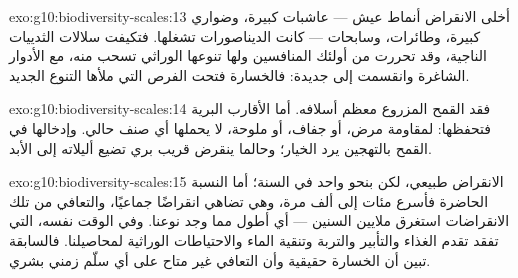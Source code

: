 \begin{solution}{exo:g10:biodiversity-scales:13}
أخلى الانقراض أنماط عيش --- عاشبات كبيرة، وضواري كبيرة، وطائرات،
وسابحات --- كانت الديناصورات تشغلها. فتكيفت سلالات الثدييات الناجية،
وقد تحررت من أولئك المنافسين ولها تنوعها الوراثي تسحب منه، مع الأدوار
الشاغرة وانقسمت إلى  جديدة: فالخسارة فتحت الفرص التي ملأها
التنوع الجديد.
\end{solution}

\begin{solution}{exo:g10:biodiversity-scales:14}
فقد القمح المزروع معظم  أسلافه. أما الأقارب البرية فتحفظها:
 لمقاومة مرض، أو جفاف، أو ملوحة، لا يحملها أي صنف حالي.
وإدخالها في القمح بالتهجين يرد الخيار؛ وحالما ينقرض قريب بري تضيع
أليلاته إلى الأبد.
\end{solution}

\begin{solution}{exo:g10:biodiversity-scales:15}
الانقراض طبيعي، لكن بنحو  واحد في السنة؛ أما النسبة الحاضرة فأسرع
مئات إلى ألف مرة، وهي تضاهي انقراضًا جماعيًا، والتعافي من تلك
الانقراضات استغرق ملايين السنين --- أي أطول مما وجد نوعنا. وفي الوقت
نفسه،  التي تفقد تقدم الغذاء والتأبير والتربة وتنقية
الماء والاحتياطات الوراثية لمحاصيلنا. فالسابقة تبين أن الخسارة حقيقية
وأن التعافي غير متاح على أي سلّم زمني بشري.
\end{solution}

